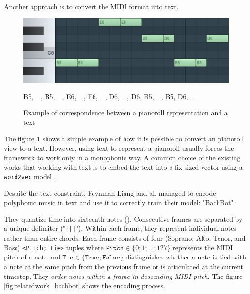 \documentclass[12pt]{report}
\begin{document}
Another approach is to convert the MIDI format into text. \cite{hadjeres_deepbach:_2016}

\begin{figure}[H]
   \begin{minipage}{0.5\textwidth}
     \centering
     \includegraphics[width=.9\linewidth]{images/music/pianoroll/pianoroll_small_2.jpg}
   \end{minipage}\hfill
   \begin{minipage}{0.5\textwidth}
     \centering
     B5, \_, B5, \_, E6, \_, E6, \_, D6, \_, D6, B5, \_, B5, D6, \_ 
   \end{minipage}
 \caption{Example of correspondence between a pianoroll representation and a text}
 \label{fig:pianoroll_to_text}
\end{figure}

The figure \ref{fig:pianoroll_to_text} shows a simple example of how it is possible to convert an pianoroll view to a text.
However, using text to represent a pianoroll usually forces the framework to work only in a monophonic way.
A common choice of the existing works that working with text is to embed the text into a fix-sized vector using a \texttt{word2vec} \cite{goldberg_word2vec_2014, karani_introduction_2018, rong_word2vec_2016, noauthor_beginners_nodate, mikolov_distributed_2013} model \cite{liang_automatic_2017, herremans_modeling_2017}.

\bigskip

Despite the text constraint, Feynman Liang and al. \cite{liang_automatic_2017} managed to encode polyphonic music in text and use it to correctly train their model: "BachBot".

They quantize time into sixteenth notes (\musEighth). Consecutive frames are separated by a unique delimiter ("\texttt{|||}").
Within each frame, they represent individual notes rather than entire chords.
Each frame consists of four (Soprano, Alto, Tenor, and Bass) \texttt{<Pitch; Tie>} tuples where $\texttt{Pitch} \in \{0; 1; \dots ; 127\}$ represents the MIDI pitch of a note and $\texttt{Tie} \in \{\texttt{True}; \texttt{False}\}$ distinguishes whether a note is tied with a note at the same pitch from the
previous frame or is articulated at the current timestep.
They \textit{order notes within a frame in descending MIDI pitch}.
The figure \ref{fig:relatedwork_bachbot} shows the encoding process.
\end{document}
